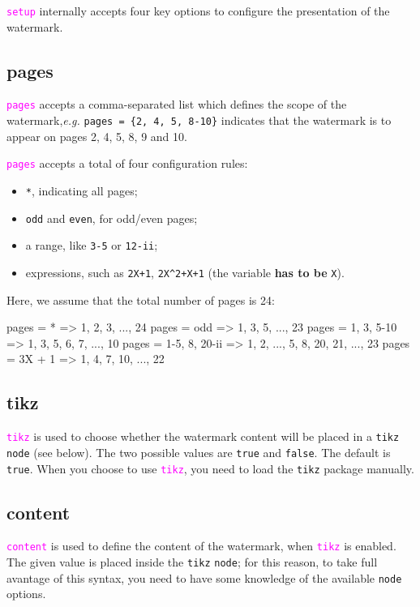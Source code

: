 \documentclass{article}
\newcounter{example}
\def\opt#1{\textcolor{magenta}{\texttt{#1}}}
\def\para#1{\textcolor[rgb]{0.13, 0.67, 0.8}{\texttt{#1}}}
\begin{document}
\opt{setup} internally accepts four key options to configure the presentation of the watermark.

\subsection{pages}
\opt{pages} accepts a comma-separated list which defines the scope of the watermark,\linebreak[4] \textit{e.g.} \verb|pages = {2, 4, 5, 8-10}| indicates that the watermark is to appear on pages 2, 4, 5, 8, 9 and 10.

\opt{pages} accepts a total of four configuration rules:
\begin{itemize}
  \item \para{*}, indicating all pages;
  \item \para{odd} and \para{even}, for odd/even pages;
  \item a range, like \para{3-5} or \para{12-ii};
  \item expressions, such as \para{2X+1}, \para{2X\^{}2+X+1} (the variable \textbf{has to be} \para{X}).
\end{itemize}

Here, we assume that the total number of pages is 24:
\begin{example}[title = pages machine rules]
pages = {*}              =>     1, 2, 3, ..., 24
pages = {odd}            =>     1, 3, 5, ..., 23
pages = {1, 3, 5-10}     =>     1, 3, 5, 6, 7, ..., 10
pages = {1-5, 8, 20-ii}  =>     1, 2, ..., 5, 8, 20, 21, ..., 23
pages = {3X + 1}         =>     1, 4, 7, 10, ..., 22
\end{example}

\subsection{tikz}

\opt{tikz} is used to choose whether the watermark content will be placed
in a \texttt{tikz} \texttt{node} (see below).
The two possible values are \para{true} and \para{false}. The default is \para{true}.
When you choose to use \opt{tikz}, you need to load the \texttt{tikz} package manually.

\subsection{content}

\opt{content} is used to define the content of the watermark, when \opt{tikz} is enabled.
The given value is placed inside the \texttt{tikz} \texttt{node};
for this reason, to take full avantage of this syntax, you need to have some knowledge
of the available \texttt{node} options.
\end{document}
